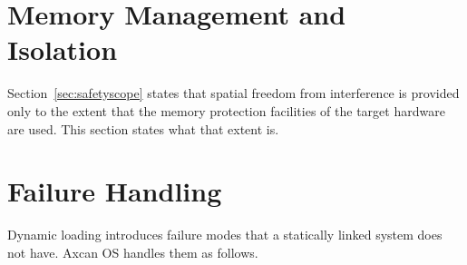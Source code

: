 \section{Memory Management and Isolation}\label{sec:os:isolation}

Section~\ref{sec:safetyscope} states that spatial freedom from interference is
provided only to the extent that the memory protection facilities of the
target hardware are used. This section states what that extent is.

%
%

\section{Failure Handling}\label{sec:os:failures}

Dynamic loading introduces failure modes that a statically linked system does
not have. Axcan OS handles them as follows.

